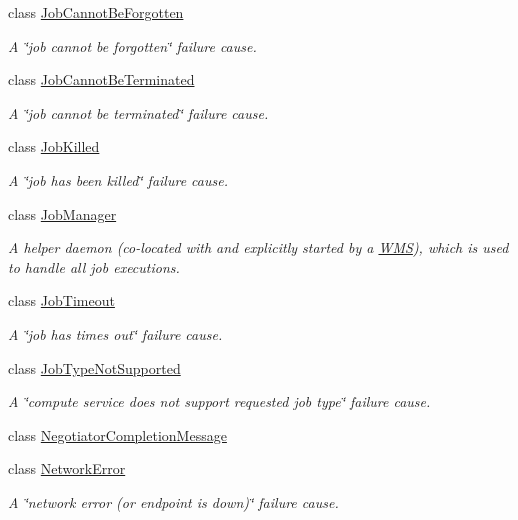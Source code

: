 \begin{DoxyCompactItemize}
class \hyperlink{classwrench_1_1_job_cannot_be_forgotten}{Job\+Cannot\+Be\+Forgotten}
\begin{DoxyCompactList}\small\item\em A \char`\"{}job cannot be forgotten\char`\"{} failure cause. \end{DoxyCompactList}\item 
class \hyperlink{classwrench_1_1_job_cannot_be_terminated}{Job\+Cannot\+Be\+Terminated}
\begin{DoxyCompactList}\small\item\em A \char`\"{}job cannot be terminated\char`\"{} failure cause. \end{DoxyCompactList}\item 
class \hyperlink{classwrench_1_1_job_killed}{Job\+Killed}
\begin{DoxyCompactList}\small\item\em A \char`\"{}job has been killed\char`\"{} failure cause. \end{DoxyCompactList}\item 
class \hyperlink{classwrench_1_1_job_manager}{Job\+Manager}
\begin{DoxyCompactList}\small\item\em A helper daemon (co-\/located with and explicitly started by a \hyperlink{classwrench_1_1_w_m_s}{W\+MS}), which is used to handle all job executions. \end{DoxyCompactList}\item 
class \hyperlink{classwrench_1_1_job_timeout}{Job\+Timeout}
\begin{DoxyCompactList}\small\item\em A \char`\"{}job has times out\char`\"{} failure cause. \end{DoxyCompactList}\item 
class \hyperlink{classwrench_1_1_job_type_not_supported}{Job\+Type\+Not\+Supported}
\begin{DoxyCompactList}\small\item\em A \char`\"{}compute service does not support requested job type\char`\"{} failure cause. \end{DoxyCompactList}\item 
class \hyperlink{classwrench_1_1_negotiator_completion_message}{Negotiator\+Completion\+Message}
\item 
class \hyperlink{classwrench_1_1_network_error}{Network\+Error}
\begin{DoxyCompactList}\small\item\em A \char`\"{}network error (or endpoint is down)\char`\"{} failure cause. \end{DoxyCompactList}\item 

\end{DoxyCompactItemize}
